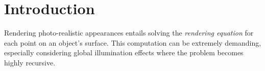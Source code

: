 \section{Introduction}
Rendering photo-realistic appearances entails solving the \textit{rendering equation} for each point on an object's surface. This computation can be extremely demanding, especially considering global illumination effects where the problem becomes highly recursive.
